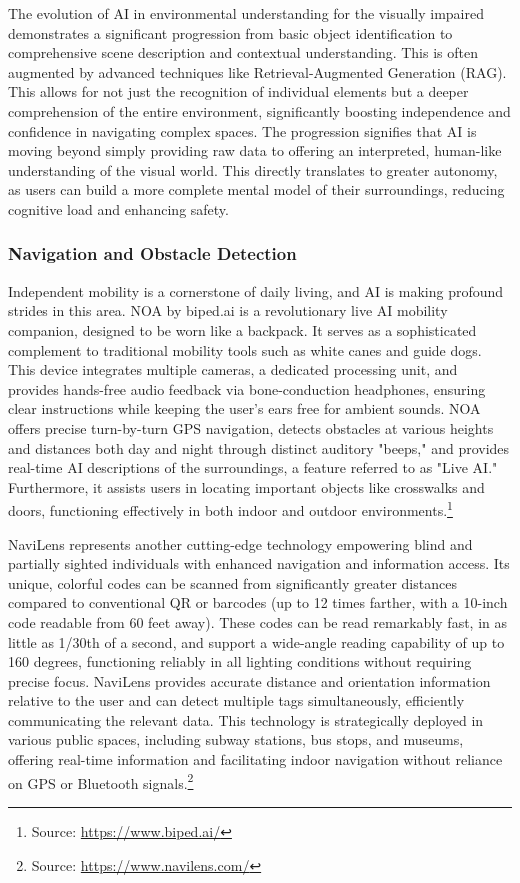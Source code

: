 The evolution of AI in environmental understanding for the visually impaired demonstrates a significant progression from basic object identification to comprehensive scene description and contextual understanding. This is often augmented by advanced techniques like Retrieval-Augmented Generation (RAG). This allows for not just the recognition of individual elements but a deeper comprehension of the entire environment, significantly boosting independence and confidence in navigating complex spaces. The progression signifies that AI is moving beyond simply providing raw data to offering an interpreted, human-like understanding of the visual world. This directly translates to greater autonomy, as users can build a more complete mental model of their surroundings, reducing cognitive load and enhancing safety.

\subsubsection{Navigation and Obstacle Detection}

Independent mobility is a cornerstone of daily living, and AI is making profound strides in this area. NOA by biped.ai is a revolutionary live AI mobility companion, designed to be worn like a backpack. It serves as a sophisticated complement to traditional mobility tools such as white canes and guide dogs. This device integrates multiple cameras, a dedicated processing unit, and provides hands-free audio feedback via bone-conduction headphones, ensuring clear instructions while keeping the user's ears free for ambient sounds. NOA offers precise turn-by-turn GPS navigation, detects obstacles at various heights and distances both day and night through distinct auditory "beeps," and provides real-time AI descriptions of the surroundings, a feature referred to as "Live AI." Furthermore, it assists users in locating important objects like crosswalks and doors, functioning effectively in both indoor and outdoor environments.\footnote{Source: \url{https://www.biped.ai/}}

NaviLens represents another cutting-edge technology empowering blind and partially sighted individuals with enhanced navigation and information access. Its unique, colorful codes can be scanned from significantly greater distances compared to conventional QR or barcodes (up to 12 times farther, with a 10-inch code readable from 60 feet away). These codes can be read remarkably fast, in as little as 1/30th of a second, and support a wide-angle reading capability of up to 160 degrees, functioning reliably in all lighting conditions without requiring precise focus. NaviLens provides accurate distance and orientation information relative to the user and can detect multiple tags simultaneously, efficiently communicating the relevant data. This technology is strategically deployed in various public spaces, including subway stations, bus stops, and museums, offering real-time information and facilitating indoor navigation without reliance on GPS or Bluetooth signals.\footnote{Source: \url{https://www.navilens.com/}}

